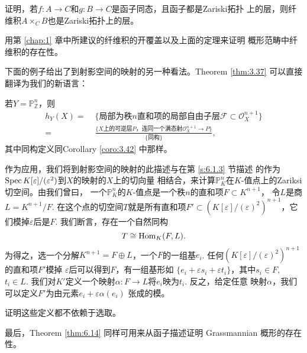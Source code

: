 \begin{exe}\label{exe:6.15}
\begin{compactenum}[(a)]
\item 证明，若$f:A\to C$和$g:B\to C$是函子同态，且函子都是Zariski拓扑
    上的层，则纤维积$A\times_C B$也是Zariski拓扑上的层。
\item 用第 \ref{chap:1} 章中所建议的纤维积的开覆盖以及上面的定理来证明
    概形范畴中纤维积的存在性。
\end{compactenum}
\end{exe}

下面的例子给出了到射影空间的映射的另一种看法。Theorem \ref{thm:3.37}
可以直接翻译为我们的新语言：

\begin{thm}\label{thm:6.16}
若$Y=\mathbb P_{\mathbb Z}^n$，则
\begin{align*}
h_Y(X)=&
\;\{\text{局部为秩$n$直和项的局部自由子层$\mathscr F\subset 
\mathscr O_X^{n+1}$}\}\\
=&\; \frac{\{\text{$X$上的可逆层$P$，连同一个满态射$\mathscr O_X^{n+1}
\to P$}\}}{\{\text{同构}\}},
\end{align*}
其中同构定义同Corollary \ref{coro:3.42} 中那样。
\end{thm}

作为应用，我们将到射影空间的映射的此描述与在第 \ref{s:6.1.3} 节描述
的作为$\operatorname{Spec} K[\varepsilon]/(\varepsilon^2)$到$X$的映射的$X$上的切向量
相结合，来计算$\mathbb P_K^n$在$K$-值点上的Zariksi切空间。由我们曾曰，
一个$\mathbb P_K^n$的$K$-值点是一个秩$n$的直和项$F\subset K^{n+1}$，
令$L$是商$L=K^{n+1}/F$. 在这个点的切空间$T$就是所有直和项$F'\subset 
(K[\varepsilon]/(\varepsilon)^2)^{n+1}$，它们模掉$\varepsilon$后是$F$.
我们断言，存在一个自然同构
\[
T\cong \operatorname{Hom}_K(F,L).   
\]
为得之，选一个分解$K^{n+1}=F\oplus L$，一个$F$的一组基$e_i$. 
任何$(K[\varepsilon]/(\varepsilon)^2)^{n+1}$的直和项$F'$模掉
$\varepsilon$后可以得到$F$，有一组基形如
$\{e_i+\varepsilon s_i+\varepsilon t_i\}$，其中$s_i\in F$, $t_i\in L$.
我们对$K'$定义一个映射$\alpha:F\to L$将$e_i$映为$t_i$. 反之，给定任意
映射$\alpha$，我们可以定义$F'$为由元素$e_i+\varepsilon\alpha(e_i)$
张成的模。

\begin{exe}\label{exe:6.17}
证明这些定义都不依赖于选取。
\end{exe}

最后，Theorem \ref{thm:6.14} 同样可用来从函子描述证明 Grassmannian
概形的存在性。

